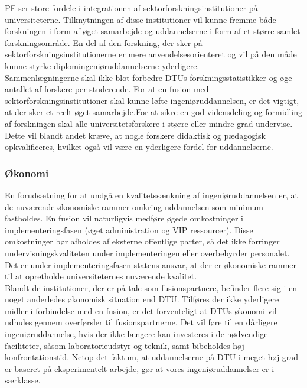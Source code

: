 PF ser store fordele i integrationen af sektorforskningsinstitutioner på universiteterne. Tilknytningen af disse institutioner vil kunne fremme både forskningen i form af øget samarbejde og uddannelserne i form af et større samlet forskningsområde. En del af den forskning, der sker på sektorforskningsinstitutionerne er mere anvendelsesorienteret og vil på den måde kunne styrke diplomingeniøruddannelserne yderligere. \\

Sammenlægningerne skal ikke blot forbedre DTUs forskningsstatistikker og øge antallet af forskere per studerende. For at en fusion med sektorforskningsinstitutioner skal kunne løfte ingeniøruddannelsen, er det vigtigt, at der sker et reelt øget samarbejde.For at sikre en god vidensdeling og formidling af forskningen skal alle universitetsforskere i større eller mindre grad undervise. Dette vil blandt andet kræve, at nogle forskere didaktisk og pædagogisk opkvalificeres, hvilket også vil være en yderligere fordel for uddannelserne.

\subsubsection{Økonomi}
En forudsætning for at undgå en kvalitetssænkning af ingeniøruddannelsen er, at de nuværende økonomiske rammer omkring uddannelsen som minimum fastholdes. En fusion vil naturligvis medføre øgede omkostninger i implementeringsfasen (øget administration og VIP ressourcer). Disse omkostninger bør afholdes af eksterne offentlige parter, så det ikke forringer undervisningskvaliteten under implementeringen eller overbebyrder personalet. Det er under implementeringsfasen statens ansvar, at der er økonomiske rammer til at opretholde universiteternes nuværende kvalitet.\\

Blandt de institutioner, der er på tale som fusionspartnere, befinder flere sig i en noget anderledes økonomisk situation end DTU. Tilføres der ikke yderligere midler i forbindelse med en fusion, er det forventeligt at DTUs økonomi vil udhules gennem overførsler til fusionspartnerne. Det vil føre til en dårligere ingeniøruddannelse, hvis der ikke længere kan investeres i de nødvendige faciliteter, såsom laboratorieudstyr og teknik, samt bibeholdes høj konfrontationstid. Netop det faktum, at uddannelserne på DTU i meget høj grad er baseret på eksperimentelt arbejde, gør at vores ingeniøruddannelser er i særklasse.\\

